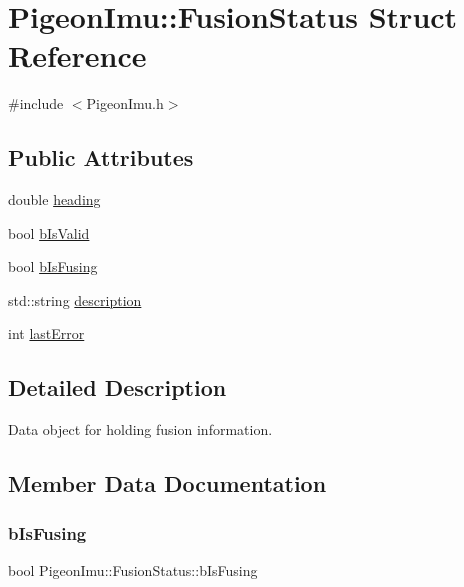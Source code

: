 \hypertarget{struct_pigeon_imu_1_1_fusion_status}{}\section{Pigeon\+Imu\+:\+:Fusion\+Status Struct Reference}
\label{struct_pigeon_imu_1_1_fusion_status}


{\ttfamily \#include $<$Pigeon\+Imu.\+h$>$}

\subsection*{Public Attributes}
\begin{DoxyCompactItemize}
\item 
double \hyperlink{struct_pigeon_imu_1_1_fusion_status_aa0b4d08f79b917d476477a635e67e99b}{heading}
\item 
bool \hyperlink{struct_pigeon_imu_1_1_fusion_status_a09db898f92aece7aa8e26d9e181cbafd}{b\+Is\+Valid}
\item 
bool \hyperlink{struct_pigeon_imu_1_1_fusion_status_a26dd4c21e27118aa1eb9efffe4059f48}{b\+Is\+Fusing}
\item 
std\+::string \hyperlink{struct_pigeon_imu_1_1_fusion_status_a3aec3a1a6919d3e47dcc48e2f1032317}{description}
\item 
int \hyperlink{struct_pigeon_imu_1_1_fusion_status_a441ba9a153a21bef98f8eeeba7c33d90}{last\+Error}
\end{DoxyCompactItemize}


\subsection{Detailed Description}
Data object for holding fusion information. 

\subsection{Member Data Documentation}
\mbox{\label{struct_pigeon_imu_1_1_fusion_status_a26dd4c21e27118aa1eb9efffe4059f48}} 
\subsubsection{\texorpdfstring{b\+Is\+Fusing}{bIsFusing}}
{\footnotesize\ttfamily bool Pigeon\+Imu\+::\+Fusion\+Status\+::b\+Is\+Fusing}

